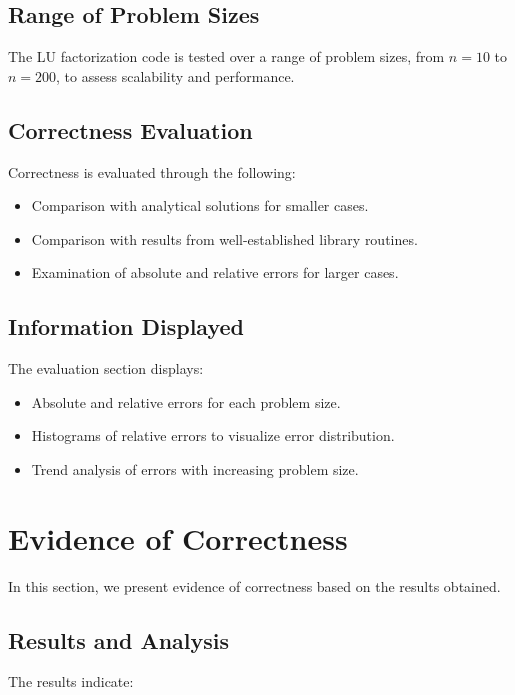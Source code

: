 \documentclass{article}
\begin{document}
\subsection{Range of Problem Sizes}
The LU factorization code is tested over a range of problem sizes, from $n=10$ to $n=200$, to assess scalability and performance.

\subsection{Correctness Evaluation}
Correctness is evaluated through the following:
\begin{itemize}
    \item Comparison with analytical solutions for smaller cases.
    \item Comparison with results from well-established library routines.
    \item Examination of absolute and relative errors for larger cases.
\end{itemize}

\subsection{Information Displayed}
The evaluation section displays:
\begin{itemize}
    \item Absolute and relative errors for each problem size.
    \item Histograms of relative errors to visualize error distribution.
    \item Trend analysis of errors with increasing problem size.
\end{itemize}

\section{Evidence of Correctness}
In this section, we present evidence of correctness based on the results obtained.

\subsection{Results and Analysis}
The results indicate:
\end{document}

